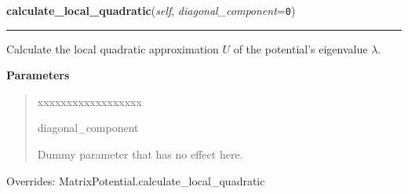 \hspace{.8\funcindent}\begin{boxedminipage}{\funcwidth}

    \raggedright \textbf{calculate\_local\_quadratic}(\textit{self}, \textit{diagonal\_component}={\tt 0})

    \vspace{-1.5ex}

    \rule{\textwidth}{0.5\fboxrule}
\setlength{\parskip}{2ex}
    Calculate the local quadratic approximation $U$ of the potential's
    eigenvalue $\lambda$.

\setlength{\parskip}{1ex}
      \textbf{Parameters}
      \vspace{-1ex}

      \begin{quote}
        \begin{Ventry}{xxxxxxxxxxxxxxxxxx}

          \item[diagonal\_component]

          Dummy parameter that has no effect here.

        \end{Ventry}

      \end{quote}

      Overrides: MatrixPotential.calculate\_local\_quadratic

    \end{boxedminipage}

    \vspace{0.5ex}

